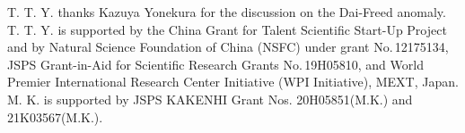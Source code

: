 \documentclass[11pt,a4paper]{article}
\begin{document}
T. T. Y. thanks Kazuya Yonekura for the discussion on the Dai-Freed anomaly. T. T. Y. is supported by the China Grant for
Talent Scientific Start-Up Project and by Natural Science
Foundation of China (NSFC) under grant No.\,12175134,
JSPS Grant-in-Aid for Scientific Research
Grants No.\,19H05810, 
and World Premier International Research Center
Initiative (WPI Initiative), MEXT, Japan.
M. K. is supported by JSPS KAKENHI Grant Nos. 20H05851(M.K.) and 21K03567(M.K.). 

   



\end{document}
